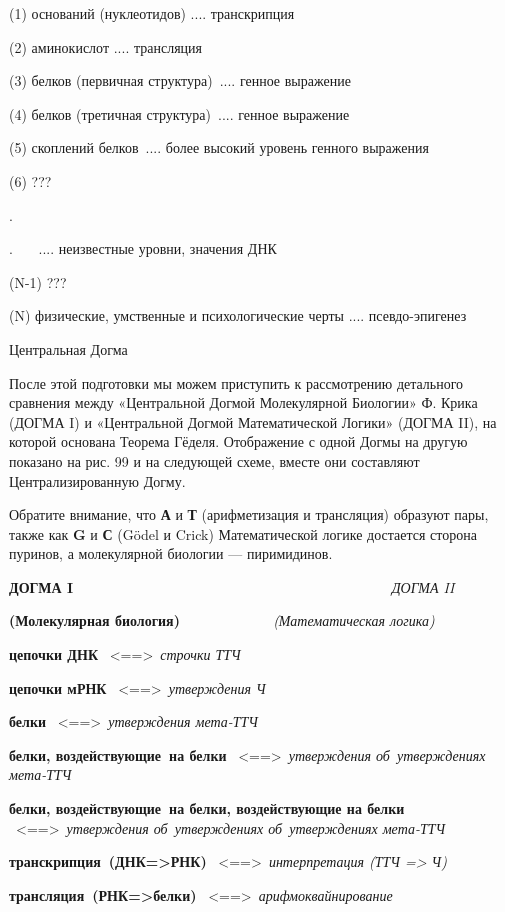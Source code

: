 \documentclass[../main.tex]{subfiles}
\begin{document}
(1) оснований (нуклеотидов) .... транскрипция

(2) аминокислот .... трансляция

(3) белков (первичная структура)~.... генное выражение

(4) белков (третичная структура)~.... генное выражение

(5) скоплений белков~.... более высокий уровень генного выражения

(6) ???

.

.~~~ .... неизвестные уровни, значения ДНК

(N-1) ???

(N) физические, умственные и психологические черты .... псевдо-эпигенез

Центральная Догма

После этой подготовки мы можем приступить к рассмотрению детального сравнения между «Центральной Догмой Молекулярной Биологии» Ф. Крика (ДОГМА I) и «Центральной Догмой Математической Логики» (ДОГМА II), на которой основана Теорема Гёделя. Отображение с одной Догмы на другую показано на рис. 99 и на следующей схеме, вместе они составляют Централизированную Догму.

Обратите внимание, что \textbf{А} и \textbf{Т} (арифметизация и трансляция) образуют пары, также как \textbf{G} и \textbf{С} (Gödel и Crick) Математической логике достается сторона пуринов, а молекулярной биологии --- пиримидинов.

\textbf{ДОГМА I~~~~~~~~~~~~~~~~~~~~~~~~~~~~~~~~~~~~~~~} \emph{ДОГМА II}

\textbf{(Молекулярная биология)~~~~~~~~~~~} \emph{(Математическая логика)}

\textbf{цепочки ДНК} ~\textless==\textgreater~\emph{строчки ТТЧ}

\textbf{цепочки мРНК} ~\textless==\textgreater~\emph{утверждения Ч}

\textbf{белки} ~\textless==\textgreater~\emph{утверждения мета-ТТЧ}

\textbf{белки, воздействующие~на белки} ~\textless==\textgreater~\emph{утверждения об~утверждениях мета-ТТЧ}

\textbf{белки, воздействующие~на белки, воздействующие на белки} ~\textless==\textgreater~\emph{утверждения об~утверждениях об~утверждениях мета-ТТЧ}

\textbf{транскрипция~(ДНК=\textgreater РНК)} ~\textless==\textgreater~\emph{интерпретация (ТТЧ =\textgreater{} Ч)}

\textbf{трансляция~(РНК=\textgreater белки)} ~\textless==\textgreater~\emph{арифмоквайнирование}
\end{document}
